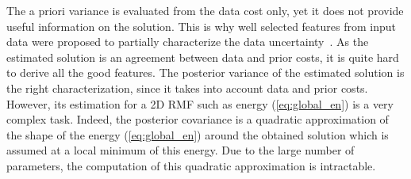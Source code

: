 \documentclass{article}
\begin{document}
The a priori variance is evaluated from the data cost only, yet it does not provide useful information on the solution. This is why well selected features from input data were proposed to partially characterize the data uncertainty~\cite{hu12}. As the estimated solution is an agreement between data and prior costs, it is quite hard to derive all the good features. The posterior variance of the estimated solution is the right characterization, since it takes into account data and prior costs. However, its estimation for a 2D RMF such as energy (\ref{eq:global_en}) is a very complex task. Indeed, the posterior covariance is a quadratic approximation of the shape of the energy (\ref{eq:global_en}) around the obtained solution which is assumed at a local minimum of this energy. Due to the large number of parameters, the computation of this quadratic approximation is intractable.
\end{document}
